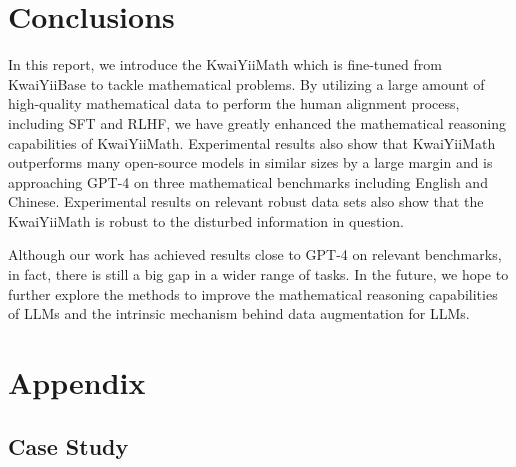 \documentclass{article}
\begin{document}
\section{Conclusions}
In this report, we introduce the KwaiYiiMath which is fine-tuned from KwaiYiiBase to tackle mathematical problems.
By utilizing a large amount of high-quality mathematical data to perform the human alignment process, including SFT and RLHF, we have greatly enhanced the mathematical reasoning capabilities of KwaiYiiMath.
Experimental results also show that KwaiYiiMath outperforms many open-source models in similar sizes by a large margin and is approaching GPT-4 on three mathematical benchmarks including English and Chinese.
Experimental results on relevant robust data sets also show that the KwaiYiiMath is robust to the disturbed information in question.

Although our work has achieved results close to GPT-4 on relevant benchmarks, in fact, there is still a big gap in a wider range of tasks.
In the future, we hope to further explore the methods to improve the mathematical reasoning capabilities of LLMs and the intrinsic mechanism behind data augmentation for LLMs.





\appendix
\section{Appendix}
\subsection{Case Study}
\end{document}
